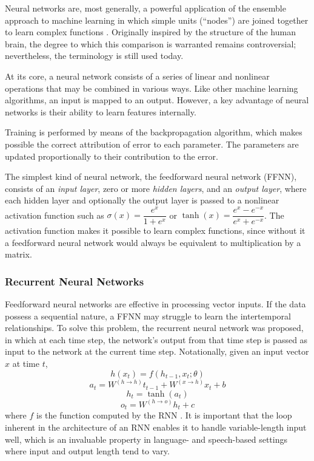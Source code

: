 Neural networks are, most generally, a powerful application of the ensemble 
approach to machine learning in which simple units (``nodes'') are joined together to learn 
complex functions \citep{aggarwal}. Originally inspired by the structure of the human brain, 
the degree to which this comparison is warranted remains controversial; nevertheless, 
the terminology is still used today.

At its core, a neural network consists of a series of linear and nonlinear operations 
that may be combined in various ways. Like other machine learning algorithms, 
an input is mapped to an output. However, a key advantage of neural networks is their ability 
to learn features internally. 

Training is performed by means of the backpropagation algorithm, which makes possible 
the correct attribution of error to each parameter. The parameters are updated proportionally 
to their contribution to the error.

The simplest kind of neural network, the feedforward neural network (FFNN), consists of an 
\textit{input layer}, zero or more \textit{hidden layers}, and an \textit{output layer}, 
where each hidden layer and optionally the output layer is passed to a nonlinear activation 
function such as $\sigma(x) = \dfrac{e^x}{1+e^x}$ or $\tanh(x) = \dfrac{e^x - e^{-x}}{e^x+e^{-x}}$. 
The activation function makes it possible to learn complex functions, since without it 
a feedforward neural network would always be equivalent to multiplication by a matrix.

\subsubsection{Recurrent Neural Networks}
Feedforward neural networks are effective in processing vector inputs. If the  
data possess a sequential nature, a FFNN may struggle to learn the intertemporal 
relationships. To solve this problem, the recurrent neural network was proposed, in which 
at each time step, the network's output from that time step is passed as input to the network at 
the current time step. Notationally, given an input vector $x$ at time $t$,
$$h(x_t) = f(h_{t-1}, x_t; \theta)$$
$$a_t = W^{(h \rightarrow h)} t_{t-1}+W^{(x \rightarrow h)} x_t + b$$
$$h_t = \tanh(a_t)$$
$$o_t = W^{(h \rightarrow o)}h_t + c$$
where $f$ is the function computed by the RNN \citep{dlbible}. It is important that the loop inherent 
in the architecture of an RNN enables it to handle variable-length input well, which 
is an invaluable property in language- and speech-based settings where input and 
output length tend to vary.

